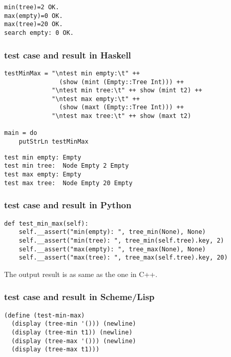 \documentclass{article}
\begin{document}
\begin{verbatim}
min(tree)=2 OK.
max(empty)=0 OK.
max(tree)=20 OK.
search empty: 0 OK.
\end{verbatim}

\subsubsection*{test case and result in Haskell}

\lstset{language=Haskell}
\begin{lstlisting}
testMinMax = "\ntest min empty:\t" ++ 
               (show (mint (Empty::Tree Int))) ++
             "\ntest min tree:\t" ++ show (mint t2) ++ 
             "\ntest max empty:\t" ++ 
               (show (maxt (Empty::Tree Int))) ++
             "\ntest max tree:\t" ++ show (maxt t2)

main = do
    putStrLn testMinMax
\end{lstlisting}

\begin{verbatim}
test min empty: Empty
test min tree:  Node Empty 2 Empty
test max empty: Empty
test max tree:  Node Empty 20 Empty
\end{verbatim}

\subsubsection*{test case and result in Python}

\lstset{language=Python}
\begin{lstlisting}
def test_min_max(self):
    self.__assert("min(empty): ", tree_min(None), None)
    self.__assert("min(tree): ", tree_min(self.tree).key, 2)
    self.__assert("max(empty): ", tree_max(None), None)
    self.__assert("max(tree): ", tree_max(self.tree).key, 20)
\end{lstlisting}

The output result is as same as the one in C++.

\subsubsection*{test case and result in Scheme/Lisp}

\lstset{language=lisp}
\begin{lstlisting}
(define (test-min-max)
  (display (tree-min '())) (newline)
  (display (tree-min t1)) (newline)
  (display (tree-max '())) (newline)
  (display (tree-max t1)))
\end{lstlisting}
\end{document}
